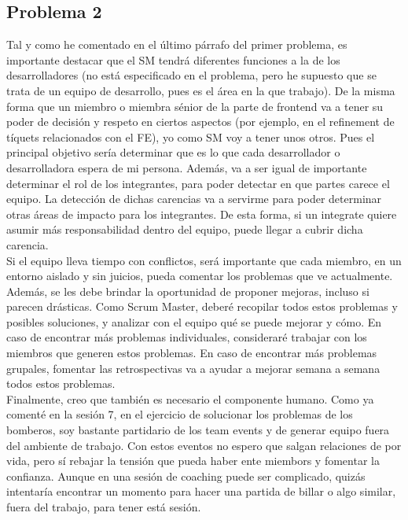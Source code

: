 \documentclass[a4paper, 11pt, oneside]{article}
\begin{document}
\subsection{Problema 2}
Tal y como he comentado en el último párrafo del primer problema, es importante
destacar que el SM tendrá diferentes funciones a la de los desarrolladores (no
está especificado en el problema, pero he supuesto que se trata de un equipo de
desarrollo, pues es el área en la que trabajo). De la misma forma que un miembro
o miembra sénior de la parte de frontend va a tener su poder de decisión y
respeto en ciertos aspectos (por ejemplo, en el refinement de tíquets
relacionados con el FE), yo como SM voy a tener unos otros. Pues el principal
objetivo sería determinar que es lo que cada desarrollador o desarrolladora
espera de mi persona. Además, va a ser igual de importante determinar el rol de
los integrantes, para poder detectar en que partes carece el equipo. La detección
de dichas carencias va a servirme para poder determinar otras áreas de impacto
para los integrantes. De esta forma, si un integrate quiere asumir más
responsabilidad dentro del equipo, puede llegar a cubrir dicha carencia.
\\
Si el equipo lleva tiempo con conflictos, será importante que cada miembro, en
un entorno aislado y sin juicios, pueda comentar los problemas que ve
actualmente. Además, se les debe brindar la oportunidad de proponer mejoras,
incluso si parecen drásticas. Como Scrum Master, deberé recopilar todos estos
problemas y posibles soluciones, y analizar con el equipo qué se puede mejorar y
cómo. En caso de encontrar más problemas individuales, consideraré trabajar con
los miembros que generen estos problemas. En caso de encontrar más problemas
grupales, fomentar las retrospectivas va a ayudar a mejorar semana a semana
todos estos problemas.
\\
Finalmente, creo que también es necesario el componente humano. Como ya comenté
en la sesión 7, en el ejercicio de solucionar los problemas de los bomberos, soy
bastante partidario de los team events y de generar equipo fuera del ambiente de
trabajo. Con estos eventos no espero que salgan relaciones de por vida, pero sí
rebajar la tensión que pueda haber ente miembors y fomentar la confianza. Aunque
en una sesión de coaching puede ser complicado, quizás intentaría encontrar un
momento para hacer una partida de billar o algo similar, fuera del trabajo, para
tener está sesión.
\end{document}
